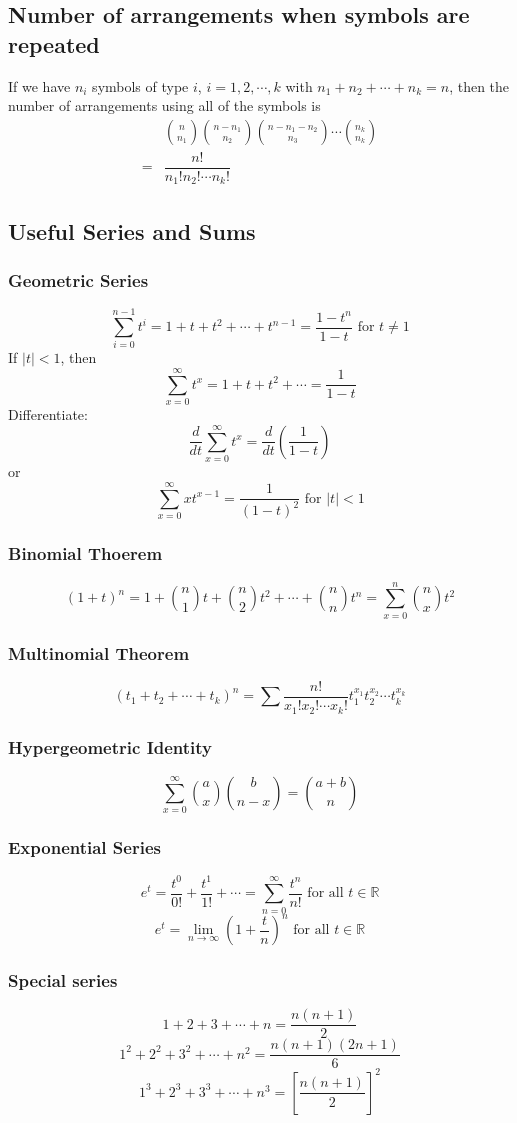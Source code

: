 \documentclass[11pt]{article}
\newcommand{\R}{{\mathbb{R}}}
\begin{document}
\subsection{Number of arrangements when symbols are repeated}
If we have $n_i$ symbols of type $i$, $i=1,2,\cdots,k$ with $n_1+n_2+\cdots+n_k=n$, then the number of arrangements using all of the symbols is 
\begin{align*}
    &{n\choose n_1}{n-n_1\choose n_2}{n-n_1-n_2\choose n_3}\cdots{n_k\choose n_k} \\
    = &\dfrac{n!}{n_1!n_2!\cdots n_k!}
\end{align*}
\subsection{Useful Series and Sums}
\subsubsection{Geometric Series}
\[\sum_{i=0}^{n-1}t^i = 1+t+t^2+\cdots+t^{n-1} = \frac{1-t^n}{1-t}\text{ for } t\neq1\]
If $|t|<1$, then 
\[\sum_{x=0}^{\infty}t^x = 1+t+t^2+\cdots=\frac{1}{1-t}\]
Differentiate:
\[\frac{d}{dt}\sum_{x=0}^{\infty}t^x = \frac{d}{dt}(\frac{1}{1-t})\]
or 
\[\sum_{x=0}^{\infty}xt^{x-1} = \frac{1}{(1-t)^2}\text{ for }|t|<1\]
\subsubsection{Binomial Thoerem}
\[(1+t)^n = 1 + {n\choose1}t + {n\choose2}t^2 + \cdots + {n\choose n}t^n = \sum_{x=0}^{n}{n\choose x}t^2\]
\subsubsection{Multinomial Theorem}
\[(t_1+t_2+\cdots+t_k)^n = \sum\frac{n!}{x_1!x_2!\cdots x_k!}t_1^{x_1}t_2^{x_2}\cdots t_k^{x_k}\]
\subsubsection{Hypergeometric Identity}
\[\sum_{x=0}^{\infty}{a\choose x}{b\choose n-x} = {a+b\choose n}\]
\subsubsection{Exponential Series}
\[e^t = \frac{t^0}{0!}+\frac{t^1}{1!}+\cdots = \sum_{n=0}^{\infty}\frac{t^n}{n!} \text{ for all } t\in\R\]
\[e^t = \lim_{n\rightarrow\infty}(1+\frac{t}{n})^n \text{ for all } t\in\R\]
\subsubsection{Special series}
\[1+2+3+\cdots+n = \frac{n(n+1)}{2}\]
\[1^2+2^2+3^2+\cdots+n^2 = \frac{n(n+1)(2n+1)}{6}\]
\[1^3+2^3+3^3+\cdots+n^3 = [\frac{n(n+1)}{2}]^2\]
\end{document}
